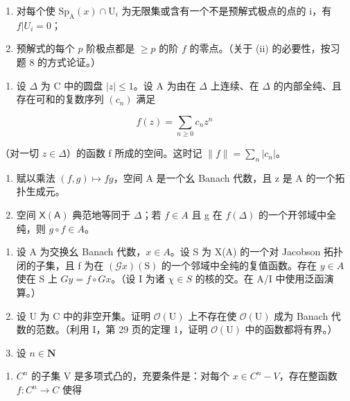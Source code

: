 \begin{enumerate}
\def\labelenumi{(\roman{enumi})}
\item
  对每个使 \(\mathrm{Sp}_{\mathrm{A}}(x)\cap\mathrm{U}_{i}\) 为无限集或含有一个不是预解式极点的点的 i，有 \(f|U_{i}=0\)；
\item
  预解式的每个 \(p\) 阶极点都是 \(\geqslant p\) 的阶 \(f\) 的零点。（关于 (ii) 的必要性，按习题 8 的方式论证。）
\end{enumerate}

\begin{enumerate}
\def\labelenumi{\arabic{enumi})}
\setcounter{enumi}{9}
\tightlist
\item
  设 \(\Delta\) 为 C 中的圆盘 \(|z| \leqslant 1\)。设 A 为由在 \(\Delta\) 上连续、在 \(\Delta\) 的内部全纯、且存在可和的复数序列 \((c_{n})\) 满足
\end{enumerate}

\[
f (z) = \sum_ {n \geqslant 0} c _ {n} z ^ {n}
\]

（对一切 \(z \in \Delta\)）的函数 f 所成的空间。这时记 \(\|f\| = \sum_{n}|c_{n}|\)。

\begin{enumerate}
\def\labelenumi{\alph{enumi})}
\item
  赋以乘法 \((f,g)\mapsto fg\)，空间 A 是一个幺 Banach 代数，且 z 是 A 的一个拓扑生成元。
\item
  空间 \(\mathsf{X}(\mathsf{A})\) 典范地等同于 \(\Delta\)；若 \(f \in A\) 且 g 在 \(f(\Delta)\) 的一个开邻域中全纯，则 \(g \circ f \in A\)。
\end{enumerate}

\begin{enumerate}
\def\labelenumi{\arabic{enumi})}
\setcounter{enumi}{10}
\item
  设 A 为交换幺 Banach 代数，\(x \in A\)。设 S 为 X(A) 的一个对 Jacobson 拓扑闭的子集，且 f 为在 \((\mathcal{G}x)(\mathrm{S})\) 的一个邻域中全纯的复值函数。存在 \(y \in A\) 使在 S 上 \(Gy = f \circ Gx\)。（设 I 为诸 \(\chi \in S\) 的核的交。在 A/I 中使用泛函演算。）
\item
  设 U 为 C 中的非空开集。证明 \(\mathcal{O}(\mathrm{U})\) 上不存在使 \(\mathcal{O}(\mathrm{U})\) 成为 Banach 代数的范数。（利用 I，第 29 页的定理 1，证明 \(\mathcal{O}(\mathrm{U})\) 中的函数都将有界。）
\item
  设 \(n\in \mathbf{N}\)
\end{enumerate}

\begin{enumerate}
\def\labelenumi{\alph{enumi})}
\tightlist
\item
  \(C^{n}\) 的子集 V 是多项式凸的，充要条件是：对每个 \(x \in C^{n} - V\)，存在整函数 \(f: C^{n} \to C\) 使得
\end{enumerate}

